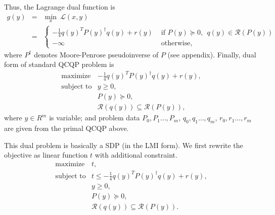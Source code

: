 \documentclass[10pt,oneside]{book}
\theoremstyle{definition}
\begin{document}
Thus, the Lagrange dual function is 
\begin{eqnarray}
g(y) &=& \min_x \ \mathcal{L}(x,y) \\
&=& \left\lbrace \begin{array}{ll} 
-\frac{1}{4}q(y)^TP(y)^{\dagger}q(y) + r(y) & \mbox{ if } P(y)\succeq 0,\ \ q(y)\in\mathcal{R}(P(y))\\ 
-\infty & \mbox{ otherwise,}
\end{array}\right. 
\end{eqnarray}
where $P^\dagger$ denotes Moore-Penrose pseudoinverse of $P$ (see appendix).
Finally, dual form of standard QCQP problem is 
\begin{equation}
\label{QCQD} 
\begin{array}{ll}
\mbox{maximize} & -\frac{1}{4}q(y)^TP(y)^{\dagger}q(y) + r(y), \\
\mbox{subject to}&  y \geq 0,\\
& P(y )\succeq 0, \\
& \mathcal{R}(q(y)) \subseteq \mathcal{R}(P(y)),
\end{array} 
\tag{QCQP Dual}
\end{equation}
where $y\in R^m$ is variable; and problem data $P_0,P_1\dots ,P_m$, $q_0,q_1\dots ,q_m$, $r_0,r_1\dots , r_m$ are given from the primal QCQP above.


This dual problem is basically a SDP (in the LMI form). We first rewrite the objective as linear function $t$ with additional constraint.
\begin{equation}
\begin{array}{ll}
\mbox{maximize} & t ,\\
\mbox{subject to}&  t\leq -\frac{1}{4}q(y)^TP(y)^{\dagger}q(y) + r(y), \\
&y \geq 0,\\
& P(y )\succeq 0,\\
& \mathcal{R}(q(y)) \subseteq \mathcal{R}(P(y)).
\end{array} 
\end{equation}
\end{document}
